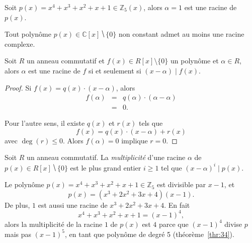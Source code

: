 \begin{example}
  \label{exe:40}
  Soit $p(x) = x^4 + x^3 + x^2 + x + 1 ∈ ℤ_5(x)$, alors $α = 1$ est une racine de $p(x)$. 
\end{example}


\begin{theorem}
  \label{thr:44}
  Tout polynôme $p(x) ∈ℂ[x] ⧹\{0\}$ non constant admet au moins une racine complexe.
\end{theorem}




\begin{theorem}
  \label{thr:35}
  Soit $R$ un anneau commutatif et  $f(x)∈ R[x] \setminus \{0\}$ un polynôme  et $\alpha \in R$, alors $\alpha$ est une racine de $f$ si et seulement si $(x- \alpha)  \mid f(x)$. 
\end{theorem}

\begin{proof}
  Si $f(x) = q(x) \cdot (x - \alpha)$, alors
  \begin{eqnarray*}
    \label{eq:52}
    f(\alpha) & = & q(α) \cdot (α - \alpha)\\ 
              & = & 0.
  \end{eqnarray*}

Pour l'autre sens, il existe $q(x)$ et $r(x)$ tels que
\begin{displaymath}
  f(x) = q(x) \cdot (x - \alpha) + r(x)
\end{displaymath}
avec $\deg(r) \leq 0$. Alors $f(\alpha) = 0$ implique $r=0$. 
\end{proof}


\begin{definition}
  \label{def:41}
  Soit $R$ un anneau commutatif. 
  La \emph{multiplicité} d'une racine $α$ de $p(x) ∈ R[x] ⧹\{0\}$ est le plus grand entier $i≥1$ tel que $ (x-α)^i \mid p(x)$. %
\end{definition} 


\begin{example}  
  \label{exe:45}
  Le polynôme  $p(x) = x^4 + x^3 + x^2 + x + 1  ∈ℤ_5$  est divisible par $x-1$, et
  \begin{displaymath}
    p(x)  = (x^3 + 2x^2 + 3x + 4)  (x-1). 
  \end{displaymath}
  De plus, $1$ est aussi une racine de $x^3 + 2x^2 + 3x + 4$. En fait 
  \begin{displaymath}
    x^4 + x^3 + x^2 + x + 1 = (x-1)^4,
  \end{displaymath}
  alors la multiplicité de la racine $1$ de $p(x)$ est $4$ parce que $(x-1)^4$ divise $p$ mais pas $(x-1)^5$, en tant que polynôme de degré 5 (théorème~\ref{thr:34}).   
\end{example}




